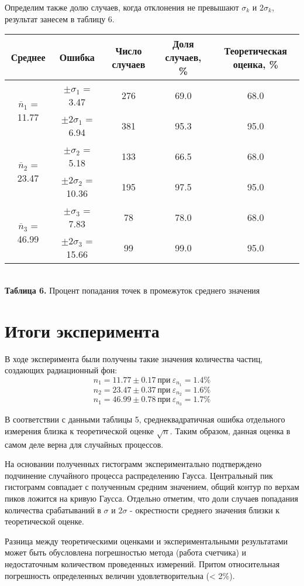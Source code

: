 \documentclass[12pt,a4paper]{scrartcl}
\begin{document}
	Определим также долю случаев, когда отклонения не превышают $\sigma_k$ и $2\sigma_k$, результат занесем в таблицу 6.
	\begin{center}
		\begin{tabular}{|c|c|c|c|c|}
			\hline Среднее & Ошибка & Число случаев & Доля случаев, \% & Теоретическая оценка, \%
			\\\hline \multirow{2}{*}{$\overline{n}_1$ = 11.77} & $\pm \sigma_1$ = 3.47 & 276 & 69.0 & 68.0
			\\ & $\pm 2\sigma_1$ = 6.94 & 381 & 95.3 & 95.0
			\\\hline \multirow{2}{*}{$\overline{n}_2$ = 23.47} & $\pm \sigma_2$ = 5.18 & 133 & 66.5 & 68.0
			\\ & $\pm 2\sigma_2$ = 10.36 & 195 & 97.5 & 95.0
			\\\hline \multirow{2}{*}{$\overline{n}_3$ = 46.99} & $\pm \sigma_3$ = 7.83 & 78 & 78.0 & 68.0
			\\ & $\pm 2\sigma_3$ = 15.66 & 99 & 99.0 & 95.0
			\\\hline
		\end{tabular}
		\\\textbf{Таблица 6.} Процент попадания точек в промежуток среднего значения 
	\end{center}

	\section{Итоги эксперимента}
	В ходе эксперимента были получены такие значения количества частиц, создающих радиационный фон:
	$$n_1 = 11.77 \pm 0.17\ \text{при} \ \varepsilon_{n_1} = 1.4\%$$
	$$n_2 = 23.47 \pm 0.37\ \text{при} \ \varepsilon_{n_2} = 1.6\%$$
	$$n_1 = 46.99 \pm 0.78\ \text{при} \ \varepsilon_{n_3} = 1.7\%$$
	
	В соответствии с данными таблицы 5, среднеквадратичная ошибка отдельного измерения близка к теоретической оценке $\sqrt{n}$. Таким образом, данная оценка в самом деле верна для случайных процессов.
	
	На основании полученных гистограмм экспериментально подтверждено подчинение случайного процесса распределению Гаусса. Центральный пик гистограмм совпадает с полученным средним значением, общий контур по верхам пиков ложится на кривую Гаусса. Отдельно отметим, что доли случаев попадания количества срабатываний в $\sigma$ и $2\sigma$ - окрестности среднего значения близки к теоретической оценке.
	
	Разница между теоретическими оценками и экспериментальными результатами может быть обусловлена погрешностью метода (работа счетчика) и недостаточным количеством проведенных измерений. Притом относительная погрешность определенных величин удовлетворительна (< 2\%). 
\end{document}
